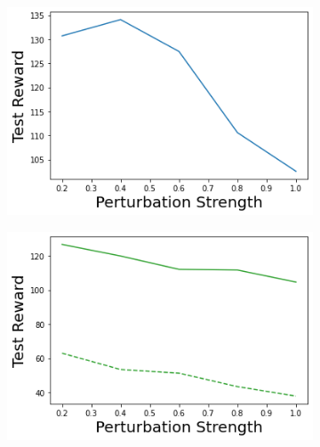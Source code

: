 \begin{figure}
\begin{subfigure}{.245\textwidth}
    \end{subfigure}
    \begin{subfigure}{.245\textwidth}
        \includegraphics[width=\textwidth]{sections/011_icml2022/resources/transition_shift-DKL-CartPoleShift-v0-mean_reward_.png}
    \end{subfigure}
    \begin{subfigure}{.245\textwidth}
        \includegraphics[width=\textwidth]{sections/011_icml2022/resources/transition_shift-PostNet-CartPoleShift-v0-mean_reward_.png}
    \end{subfigure}
    

\end{figure}
